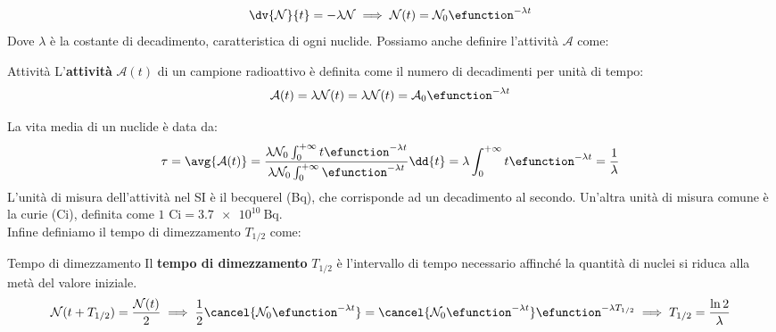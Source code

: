 \begin{equation}
    \dv{\mathcal{N}}{t} = -\lambda \mathcal{N} \implies \mathcal{N}(t) = \mathcal{N}_0 \efunction^{-\lambda t}
\end{equation}
Dove $\lambda$ è la costante di decadimento, caratteristica di ogni nuclide.
Possiamo anche definire l'attività $\mathcal{A}$ come:
\begin{definition}{Attività}
    L'\textbf{attività} $\mathcal{A}(t)$ di un campione radioattivo è definita come il numero di decadimenti per unità di tempo:
    \begin{equation}
        \mathcal{A}(t) = \lambda \mathcal{N}(t) = \lambda \mathcal{N}(t) = \mathcal{A}_0 \efunction^{-\lambda t}
    \end{equation}
\end{definition}
La vita media di un nuclide è data da:
\begin{equation}
    \tau = \avg{\mathcal{A}(t)} = \dfrac{\lambda \mathcal{N}_0 \int_0^{+\infty} t \efunction^{-\lambda t}}{\lambda \mathcal{N}_0 \int_0^{+\infty} \efunction^{-\lambda t}} \dd{t} = \lambda \int_0^{+\infty} t \efunction^{-\lambda t} = \frac{1}{\lambda}
\end{equation}
L'unità di misura dell'attività nel SI è il becquerel (Bq), che corrisponde ad un decadimento al secondo. Un'altra unità di misura comune è la curie (Ci), definita come $1 \text{ Ci} = \qty{3.7e10}{\becquerel}$.\\
Infine definiamo il tempo di dimezzamento $T_{1/2}$ come:
\begin{definition}{Tempo di dimezzamento}
    Il \textbf{tempo di dimezzamento} $T_{1/2}$ è l'intervallo di tempo necessario affinché la quantità di nuclei si riduca alla metà del valore iniziale.
    \begin{equation}
        \mathcal{N}(t + T_{1/2}) = \dfrac{\mathcal{N}(t)}{2} \implies \dfrac{1}{2}\cancel{\mathcal{N}_0 \efunction^{-\lambda t}} = \cancel{\mathcal{N}_0 \efunction^{-\lambda t}}\efunction^{-\lambda T_{1/2}} \implies T_{1/2} = \frac{\ln 2}{\lambda}
    \end{equation}
\end{definition}


